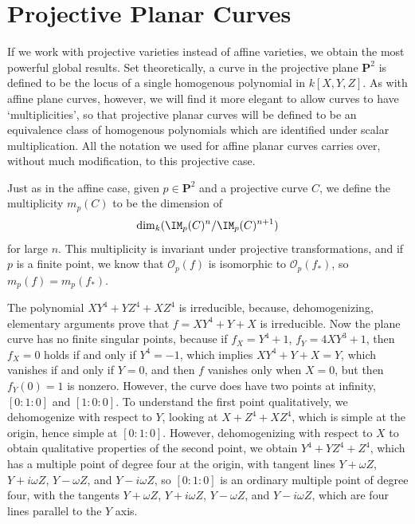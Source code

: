 \section{Projective Planar Curves}

If we work with projective varieties instead of affine varieties, we obtain the most powerful global results. Set theoretically, a curve in the projective plane $\mathbf{P}^2$ is defined to be the locus of a single homogenous polynomial in $k[X,Y,Z]$. As with affine plane curves, however, we will find it more elegant to allow curves to have `multiplicities', so that projective planar curves will be defined to be an equivalence class of homogenous polynomials which are identified under scalar multiplication. All the notation we used for affine planar curves carries over, without much modification, to this projective case.

Just as in the affine case, given $p \in \mathbf{P}^2$ and a projective curve $C$, we define the multiplicity $m_p(C)$ to be the dimension of
%
\[ \dim_k(\IM_p(C)^n/\IM_p(C)^{n+1}) \]
%
for large $n$. This multiplicity is invariant under projective transformations, and if $p$ is a finite point, we know that $\mathcal{O}_p(f)$ is isomorphic to $\mathcal{O}_p(f_*)$, so $m_p(f) = m_p(f_*)$.

\begin{example}
    The polynomial $XY^4 + YZ^4 + XZ^4$ is irreducible, because, dehomogenizing, elementary arguments prove that $f = XY^4 + Y + X$ is irreducible. Now the plane curve has no finite singular points, because if $f_X = Y^4 + 1$, $f_Y = 4XY^3 + 1$, then $f_X = 0$ holds if and only if $Y^4 = -1$, which implies $XY^4 + Y + X = Y$, which vanishes if and only if $Y = 0$, and then $f$ vanishes only when $X = 0$, but then $f_Y(0) = 1$ is nonzero. However, the curve does have two points at infinity, $[0:1:0]$ and $[1:0:0]$. To understand the first point qualitatively, we dehomogenize with respect to $Y$, looking at $X + Z^4 + XZ^4$, which is simple at the origin, hence simple at $[0:1:0]$. However, dehomogenizing with respect to $X$ to obtain qualitative properties of the second point, we obtain $Y^4 + YZ^4 + Z^4$, which has a multiple point of degree four at the origin, with tangent lines $Y + \omega Z$, $Y + i \omega Z$, $Y - \omega Z$, and $Y - i \omega Z$, so $[0:1:0]$ is an ordinary multiple point of degree four, with the tangents $Y + \omega Z$, $Y + i \omega Z$, $Y - \omega Z$, and $Y - i \omega Z$, which are four lines parallel to the $Y$ axis.
\end{example}

